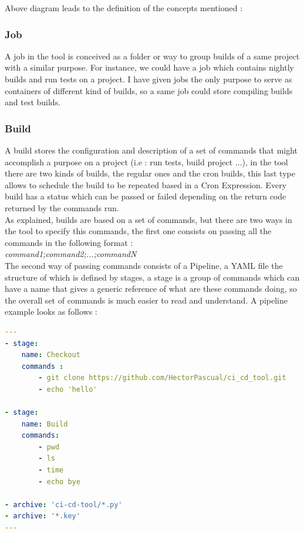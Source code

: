 \documentclass{article}
\begin{document}
Above diagram leads to the definition of the concepts mentioned :

\subsubsection{Job}

A job in the tool is conceived as a folder or way to group builds of a same project with a similar purpose. For instance, we could have a job which contains nightly builds and run tests on a project. I have given jobs the only purpose to serve as containers of different kind of builds, so a same job could store compiling builds and test builds.


\subsubsection{Build}
A build stores the configuration and description of a set of commands that might accomplish a purpose on a project (i.e : run tests, build project ...), in the tool there are two kinds of builds, the regular ones and the cron builds, this last type allows to schedule the build to be repeated based in a Cron Expression. Every build has a status which can be passed or failed depending on the return code returned by the commands run.
~\\

As explained, builds are based on a set of commands, but there are two ways in the tool to specify this commands, the first one consists on passing all the commands in the following format :
\vspace{0.2cm}
~\\
\textit{command1;command2;...;commandN}
\vspace{0.2cm}
~\\
The second way of passing commands consists of a Pipeline, a YAML file the structure of which is defined by stages, a stage is a group of commands which can have a name that gives a generic reference of what are these commands doing, so the overall set of commands is much easier to read and understand. A pipeline example looks as follows :

\begin{lstlisting}[language=yaml]
---
- stage:
    name: Checkout
    commands :
        - git clone https://github.com/HectorPascual/ci_cd_tool.git
        - echo 'hello'

- stage:
    name: Build
    commands:
        - pwd
        - ls
        - time
        - echo bye

- archive: 'ci-cd-tool/*.py'
- archive: '*.key'
---
\end{lstlisting}
\end{document}

